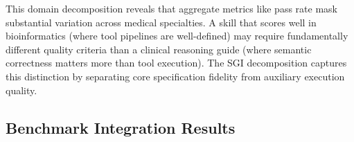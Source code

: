 \begin{table}[t]
\centering\small
\caption{Specification Groundability Index (\textsc{SGI}) by medical domain, computed using the \textsc{SGI} () with $w_c = 0.75$, decomposed into core fidelity and auxiliary quality components. Domains with fewer than 15 skills are grouped under ``Other.''}
\setlength{\tabcolsep}{3pt}
\label{tab:domain_sgi}
\end{table}


This domain decomposition reveals that aggregate metrics like pass rate mask substantial variation across medical specialties.
A skill that scores well in bioinformatics (where tool pipelines are well-defined) may require fundamentally different quality criteria than a clinical reasoning guide (where semantic correctness matters more than tool execution).
The \textsc{SGI} decomposition captures this distinction by separating core specification fidelity from auxiliary execution quality.

\subsection{Benchmark Integration Results}
\label{ssec:benchmark_integration}

